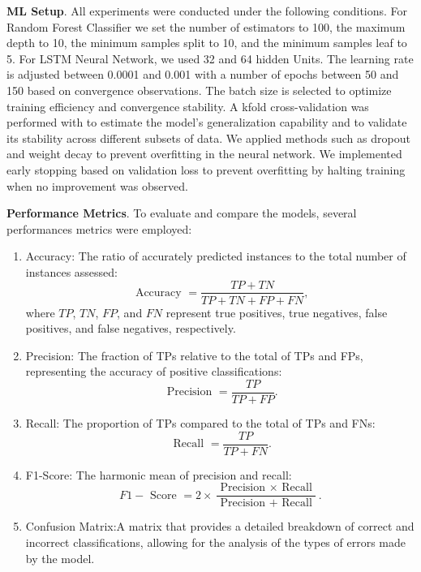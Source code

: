 \textbf{ML Setup}. All experiments were conducted under the following conditions. For Random Forest Classifier we set the number of estimators to 100, the maximum depth to 10, the minimum samples split to 10, and the minimum samples leaf to 5. For LSTM Neural Network, we used 32 and 64 hidden Units. The learning rate is adjusted between 0.0001 and 0.001 with a number of epochs between 50 and 150 based on convergence observations. The batch size is selected to optimize training efficiency and convergence stability. A kfold cross-validation was performed with to estimate the model’s generalization capability and to validate its stability across different subsets of data. We applied methods such as dropout and weight decay to prevent overfitting in the neural network. We implemented early stopping based on validation loss to prevent overfitting by halting training when no improvement was observed.

\textbf{Performance Metrics}. To evaluate and compare the models, several performances metrics were employed:
\begin{enumerate}
    \item Accuracy: The ratio of accurately predicted instances to the total number of instances assessed:
    \begin{equation}
        \text { Accuracy }=\frac{T P+T N}{T P+T N+F P+F N},
    \end{equation}
    where $TP$, $TN$, $FP$, and $FN$ represent true positives, true negatives, false positives, and false negatives, respectively.
    \item Precision: The fraction of TPs relative to the total of TPs and FPs, representing the accuracy of positive classifications:
    \begin{equation}
        \text { Precision }=\frac{T P}{T P+F P}.
    \end{equation}
    \item Recall: The proportion of TPs compared to the total of TPs and FNs:
    \begin{equation}
        \text { Recall }=\frac{T P}{T P+F N}.
    \end{equation}
    \item F1-Score: The harmonic mean of precision and recall:
    \begin{equation}
        F 1-\text { Score }=2 \times \frac{\text { Precision } \times \text { Recall }}{\text { Precision }+ \text { Recall }} .
    \end{equation}
    \item Confusion Matrix:A matrix that provides a detailed breakdown of correct and incorrect classifications, allowing for the analysis of the types of errors made by the model.
\end{enumerate}


